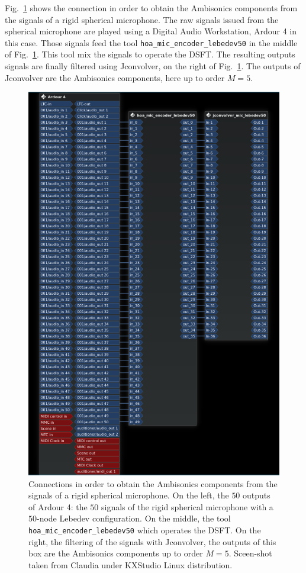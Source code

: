 \documentclass[10pt,a4paper]{article}
\begin{document}
Fig.~\ref{fig:hoa_mic_encoder_2} shows the connection in order to obtain the Ambisonics components from the signals of a rigid spherical microphone. The raw signals issued from the spherical microphone are played using a Digital Audio Workstation, Ardour 4 in this case. Those signals feed the tool \lstinline'hoa_mic_encoder_lebedev50' in the middle of Fig.~\ref{fig:hoa_mic_encoder_2}. This tool mix the signals to operate the DSFT. The resulting outputs signals are finally filtered using Jconvolver, on the right of Fig.~\ref{fig:hoa_mic_encoder_2}. The outputs of Jconvolver are the Ambisonics components, here up to order $M=5$.
\begin{figure}[!ht]
\centering
\includegraphics[width=0.75\columnwidth]{hoa_mic_encoder_2.png}
\caption{Connections in order to obtain the Ambisonics components from the signals of a rigid spherical microphone. On the left, the $50$ outputs of Ardour 4: the $50$ signals of the rigid spherical microphone with a $50$-node Lebedev configuration. On the middle, the tool \lstinline'hoa_mic_encoder_lebedev50' which operates the DSFT. On the right, the filtering of the signals with Jconvolver, the outputs of this box are the Ambisonics components up to order $M=5$. Sceen-shot taken from Claudia under KXStudio Linux distribution.}
\label{fig:hoa_mic_encoder_2}
\end{figure}
\end{document}
